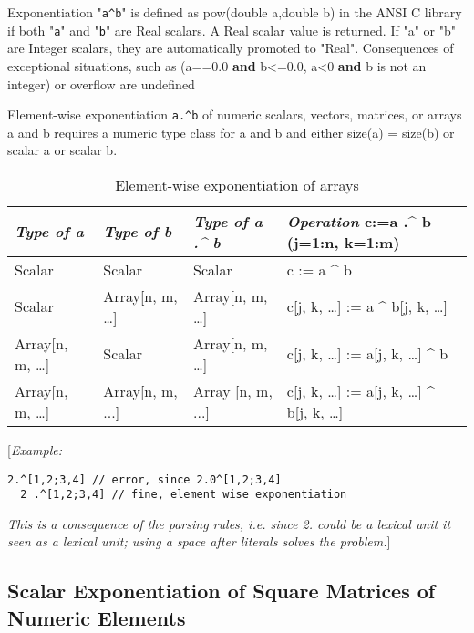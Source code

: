 Exponentiation "\lstinline!a^b!" is defined as pow(double a,double b) in the ANSI
C library if both "\lstinline!a!" and "\lstinline!b!" are Real scalars. A Real scalar value is
returned. If "a" or "b" are Integer scalars, they are automatically
promoted to "Real". Consequences of exceptional situations, such as
(a==0.0 \textbf{and} b\textless{}=0.0, a\textless{}0 \textbf{and} b is
not an integer) or overflow are undefined

Element-wise exponentiation \lstinline!a.^b! of numeric scalars, vectors,
matrices, or arrays a and b requires a numeric type class for a and b
and either size(a) = size(b) or scalar a or scalar b.

\begin{longtable}[]{|l|l|l|l|}
\caption{Element-wise exponentiation of arrays}\\
\hline
\emph{Type of a} & \emph{Type of b} & \emph{Type of a .\^{} b} &
\emph{Operation} c:=a .\^{} b (j=1:n, k=1:m)\\ \hline
\endhead
Scalar & Scalar & Scalar & c := a \^{} b\\ \hline
Scalar & Array{[}n, m, \ldots{}{]} & Array{[}n, m, \ldots{}{]} & c{[}j,
k, \ldots{}{]} := a \^{} b{[}j, k, \ldots{}{]}\\ \hline
Array{[}n, m, \ldots{}{]} & Scalar & Array{[}n, m, \ldots{}{]} & c{[}j,
k, \ldots{}{]} := a{[}j, k, \ldots{}{]} \^{} b\\ \hline
Array{[}n, m, \ldots{}{]} & Array{[}n, m, ...{]} & Array {[}n, m, ...{]}
& c{[}j, k, \ldots{}{]} := a{[}j, k, \ldots{}{]} \^{} b{[}j, k,
\ldots{}{]}\\ \hline

\end{longtable}

{[}\emph{Example:}

\begin{lstlisting}[language=modelica]
  2.^[1,2;3,4] // error, since 2.0^[1,2;3,4]
  2 .^[1,2;3,4] // fine, element wise exponentiation
\end{lstlisting}
\emph{This is a consequence of the parsing rules, i.e. since 2. could be
a lexical unit it seen as a lexical unit; using a space after literals
solves the problem.}{]}

\subsection{Scalar Exponentiation of Square Matrices of Numeric Elements}

